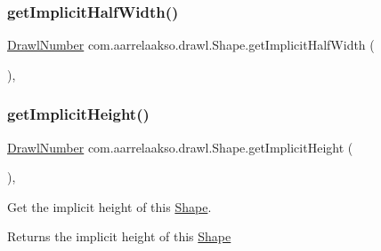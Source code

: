 \subsubsection{\texorpdfstring{get\+Implicit\+Half\+Width()}{getImplicitHalfWidth()}}
{\footnotesize\ttfamily \hyperlink{classcom_1_1aarrelaakso_1_1drawl_1_1_drawl_number}{Drawl\+Number} com.\+aarrelaakso.\+drawl.\+Shape.\+get\+Implicit\+Half\+Width (\begin{DoxyParamCaption}{ }\end{DoxyParamCaption})\hspace{0.3cm}{\ttfamily [protected]}, {\ttfamily [inherited]}}

\mbox{\label{classcom_1_1aarrelaakso_1_1drawl_1_1_shape_a41cc097acddea53404b62a812ef37276}} 
\subsubsection{\texorpdfstring{get\+Implicit\+Height()}{getImplicitHeight()}}
{\footnotesize\ttfamily \hyperlink{classcom_1_1aarrelaakso_1_1drawl_1_1_drawl_number}{Drawl\+Number} com.\+aarrelaakso.\+drawl.\+Shape.\+get\+Implicit\+Height (\begin{DoxyParamCaption}{ }\end{DoxyParamCaption})\hspace{0.3cm}{\ttfamily [protected]}, {\ttfamily [inherited]}}



Get the implicit height of this \hyperlink{classcom_1_1aarrelaakso_1_1drawl_1_1_shape}{Shape}. 

\begin{DoxyReturn}{Returns}
the implicit height of this \hyperlink{classcom_1_1aarrelaakso_1_1drawl_1_1_shape}{Shape} 
\end{DoxyReturn}
\mbox{\label{classcom_1_1aarrelaakso_1_1drawl_1_1_shape_af7ebce58a8dbba0cbe372040b74d7fca}} 
